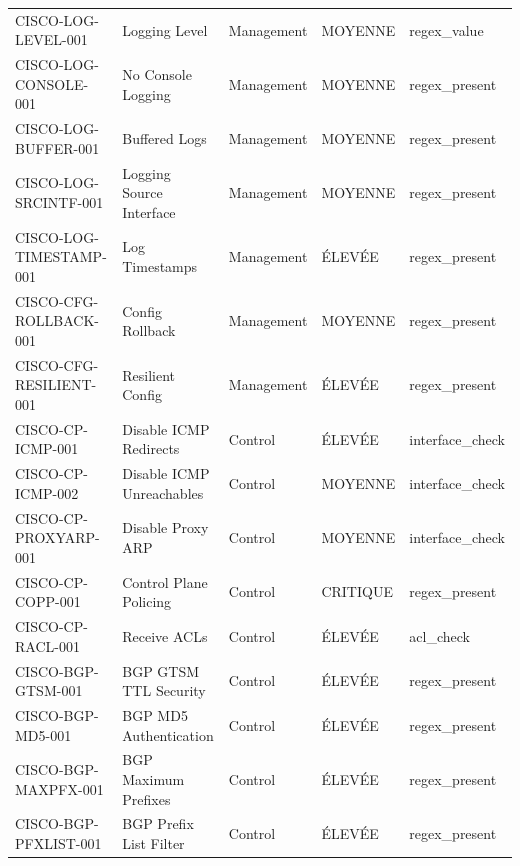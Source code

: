 \documentclass[12pt, a4paper]{report}
\begin{document}
\begin{longtable}{>{\small}p{3.8cm} >{\small}p{3cm} >{\small}p{2cm} >{\small}p{2cm} >{\small}p{2.5cm}}
  \rowcolor{tableRowA} CISCO-LOG-LEVEL-001 & Logging Level & Management & \textcolor{accentGreen}{MOYENNE} & regex\_value \\
  \rowcolor{tableRowB} CISCO-LOG-CONSOLE-001 & No Console Logging & Management & \textcolor{accentGreen}{MOYENNE} & regex\_present \\
  \rowcolor{tableRowA} CISCO-LOG-BUFFER-001 & Buffered Logs & Management & \textcolor{accentGreen}{MOYENNE} & regex\_present \\
  \rowcolor{tableRowB} CISCO-LOG-SRCINTF-001 & Logging Source Interface & Management & \textcolor{accentGreen}{MOYENNE} & regex\_present \\
  \rowcolor{tableRowA} CISCO-LOG-TIMESTAMP-001 & Log Timestamps & Management & \textcolor{accentOrange}{ÉLEVÉE} & regex\_present \\
  \rowcolor{tableRowB} CISCO-CFG-ROLLBACK-001 & Config Rollback & Management & \textcolor{accentGreen}{MOYENNE} & regex\_present \\
  \rowcolor{tableRowA} CISCO-CFG-RESILIENT-001 & Resilient Config & Management & \textcolor{accentOrange}{ÉLEVÉE} & regex\_present \\
  \rowcolor{tableRowB} CISCO-CP-ICMP-001 & Disable ICMP Redirects & Control & \textcolor{accentOrange}{ÉLEVÉE} & interface\_check \\
  \rowcolor{tableRowA} CISCO-CP-ICMP-002 & Disable ICMP Unreachables & Control & \textcolor{accentGreen}{MOYENNE} & interface\_check \\
  \rowcolor{tableRowB} CISCO-CP-PROXYARP-001 & Disable Proxy ARP & Control & \textcolor{accentGreen}{MOYENNE} & interface\_check \\
  \rowcolor{tableRowA} CISCO-CP-COPP-001 & Control Plane Policing & Control & \textcolor{accentRed}{CRITIQUE} & regex\_present \\
  \rowcolor{tableRowB} CISCO-CP-RACL-001 & Receive ACLs & Control & \textcolor{accentOrange}{ÉLEVÉE} & acl\_check \\
  \rowcolor{tableRowA} CISCO-BGP-GTSM-001 & BGP GTSM TTL Security & Control & \textcolor{accentOrange}{ÉLEVÉE} & regex\_present \\
  \rowcolor{tableRowB} CISCO-BGP-MD5-001 & BGP MD5 Authentication & Control & \textcolor{accentOrange}{ÉLEVÉE} & regex\_present \\
  \rowcolor{tableRowA} CISCO-BGP-MAXPFX-001 & BGP Maximum Prefixes & Control & \textcolor{accentOrange}{ÉLEVÉE} & regex\_present \\
  \rowcolor{tableRowB} CISCO-BGP-PFXLIST-001 & BGP Prefix List Filter & Control & \textcolor{accentOrange}{ÉLEVÉE} & regex\_present \\

\end{longtable}
\end{document}
